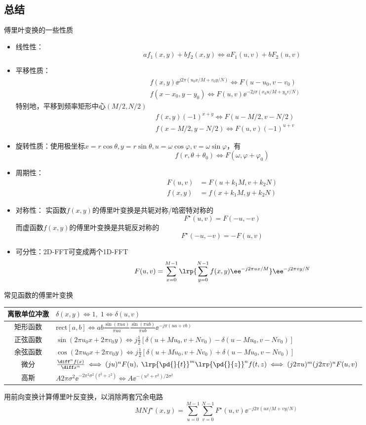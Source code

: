 \subsection{总结}
傅里叶变换的一些性质
\begin{itemize}
	\item 线性性：
	\[af_1(x,y)+bf_2(x,y)\iff aF_1(u,v)+bF_2(u,v)\]
	\item 平移性质：
	\[\begin{aligned}
	&f(x,y)\ee^{j2\pi(u_0x/M+v_0y/N)}\iff F(u-u_0,v-v_0)\\
	&f(x-x_0,y-y_0)\iff F(u,v)\ee^{-2j\pi(x_0u/M+y_0v/N)}
	\end{aligned}\]
	特别地，平移到频率矩形中心$(M/2,N/2)$
	\[\begin{aligned}
	&f(x,y)(-1)^{x+y}\iff F(u-M/2,v-N/2)\\
	&f(x-M/2,y-N/2)\iff F(u,v)(-1)^{u+v}
	\end{aligned}\]
	\item 旋转性质：使用极坐标$x=r\cos\theta,y=r\sin\theta,u=\omega\cos\varphi,v=\omega\sin\varphi$，有
	\[f(r,\theta+\theta_0)\iff F(\omega,\varphi+\varphi_0)\]
	\item 周期性：
	\[\begin{aligned}
	F(u,v)&=F(u+k_1M,v+k_2N)\\
	f(x,y)&=f(x+k_1M,y+k_2N)
	\end{aligned}\]
	\item 对称性：
	实函数$f(x,y)$的傅里叶变换是共轭对称/哈密特对称的
	\[F^\star(u,v)=F(-u,-v)\]
	而虚函数$f(x,y)$的傅里叶变换是共轭反对称的
	\[F^\star(-u,-v)=-F(u,v)\]
	\item 可分性：2D-FFT可变成两个1D-FFT
	\[F(u,v)=\sum_{x=0}^{M-1}\lrp{\sum_{y=0}^{N-1}f(x,y)\ee^{-j2\pi ux/M}}\ee^{-j2\pi vy/N}\]
\end{itemize}

常见函数的傅里叶变换
\begin{center}
\begin{tabular}{|c|l|}\hline
离散单位冲激 & $\delta(x,y)\iff 1,\;1\iff\delta(u,v)$\\\hline
矩形函数 & $\mathrm{rect}[a,b]\iff ab\frac{\sin(\pi ua)}{\pi ua}\frac{\sin(\pi ub)}{\pi ub}\ee^{-j\pi(ua+vb)}$\\\hline
正弦函数 & $\sin(2\pi u_0x+2\pi v_0y)\iff j\frac{1}{2}[\delta(u+Mu_0,v+Nv_0)-\delta(u-Mu_0,v-Nv_0)]$\\\hline
余弦函数 & $\cos(2\pi u_0x+2\pi v_0y)\iff j\frac{1}{2}[\delta(u+Mu_0,v+Nv_0)+\delta(u-Mu_0,v-Nv_0)]$\\\hline
微分 & $\frac{\diff^n f(x)}{\diff x^n}\iff (ju)^n F(u),\;\lrp{\pd{}{t}}^m\lrp{\pd{}{z}}^nf(t,z)\iff(j2\pi u)^m(j2\pi v)^nF(u,v)$\bigstrut\\\hline
高斯 & $A2\pi\sigma^2\ee^{-2\pi^2\sigma^2(t^2+z^2)}\iff A\ee^{-(u^2+v^2)/2\sigma^2}$\\\hline
\end{tabular}
\end{center}

用前向变换计算傅里叶反变换，以消除两套冗余电路
\[MNf^\star(x,y)=\sum_{u=0}^{M-1}\sum_{v=0}^{N-1} F^\star(u,v)\ee^{-j2\pi (ux/M+vy/N)}\]